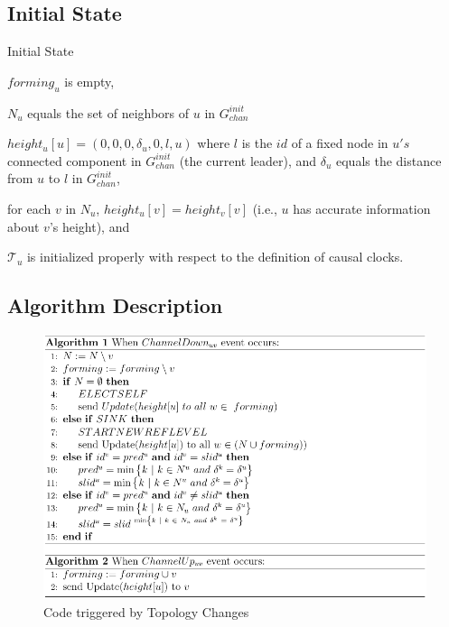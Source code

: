 \documentclass{beamer}
\begin{document}
\subsection{Initial State}
\begin{frame}{Initial State}
\begin{list}{--}
	\item $forming_u$ is empty,
	\item $N_u$ equals the set of neighbors of $u$ in $G^{init} _{chan}$
	\item $height_u[u] = (0, 0, 0, \delta _u , 0, l, u)$ where $l$ is the $id$ of a fixed node in $u's$ connected component in $G^{init} _{chan}$ (the current leader), and $\delta _u$ equals the distance from $u$ to $l$ in $G^{init} _{chan}$,
	\item for each $v$ in $N_u$, $height_u[v] = height_v[v]$ (i.e., $u$ has accurate information about $v$’s height), and
	\item $\mathcal{T} _u$ is initialized properly with respect to the definition of causal clocks.
\end{list}
\end{frame}

\subsection{Algorithm Description}

\begin{frame}
\begin{figure}[h]
	\centering
	\includegraphics[width=0.8\linewidth]{channel_up_down.png}
	\caption{Code triggered by Topology Changes}
	\label{fig:figure1}
\end{figure}
\end{frame}
\end{document}
